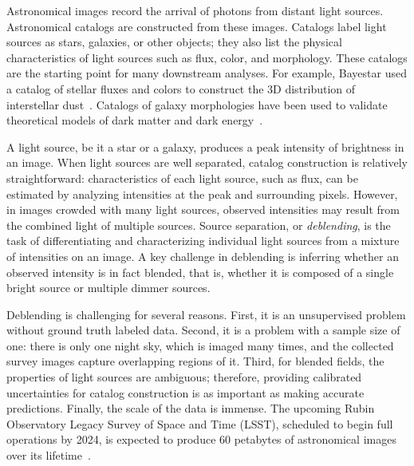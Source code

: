 Astronomical images record the arrival of photons from distant light sources.
Astronomical catalogs are constructed from these images.
Catalogs label light sources as stars, galaxies, or other objects;
they also list the physical characteristics of light sources such as flux, color, and morphology.
These catalogs are the starting point for many downstream analyses.
For example, Bayestar used a catalog of stellar fluxes and colors to construct
the 3D distribution of interstellar dust~\citep{Green_2019_argonaut}.
Catalogs of galaxy morphologies have been used to validate theoretical models of dark matter and dark energy~\citep{Abbott2018}.

A light source, be it a star or a galaxy, produces a peak intensity of brightness in an image.
When light sources are well separated, catalog construction is relatively straightforward:
characteristics of each light source, such as flux, can be estimated by analyzing
intensities at the peak and surrounding pixels.
However, in images crowded with many light sources,
observed intensities may result from the combined light of multiple sources.
Source separation, or {\itshape deblending}, is the task of differentiating and
characterizing individual light sources from a mixture of intensities on an image.
A key challenge in deblending is inferring whether an observed intensity is in fact blended,
that is, whether it is composed of a single bright source or multiple dimmer sources.


Deblending is challenging for several reasons.
First, it is an unsupervised problem without ground truth labeled data.
Second, it is a problem with a sample size of one: there is only one night sky, which is imaged many times, and the collected survey images capture overlapping regions of it.
Third, for blended fields, the properties of light sources are ambiguous; therefore, providing calibrated uncertainties for catalog construction is as important as making accurate predictions.
Finally, the scale of the data is immense.
The upcoming Rubin Observatory Legacy Survey of Space and Time (LSST),
scheduled to begin full operations by 2024,
is expected to produce 60 petabytes of astronomical images over its lifetime~\citep{LSSTabout}.

